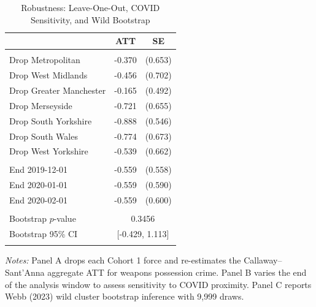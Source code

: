 \begin{table}[t]
\centering
\caption{Robustness: Leave-One-Out, COVID Sensitivity, and Wild Bootstrap}
\label{tab:robustness}
\begin{tabular}{lcc}
\hline\hline
 & ATT & SE \\
\hline
\addlinespace
\multicolumn{3}{l}{\textit{Panel A: Leave-one-out (drop one Cohort 1 force)}} \\
\addlinespace
\quad Drop Metropolitan & -0.370 & (0.653) \\
\quad Drop West Midlands & -0.456 & (0.702) \\
\quad Drop Greater Manchester & -0.165 & (0.492) \\
\quad Drop Merseyside & -0.721 & (0.655) \\
\quad Drop South Yorkshire & -0.888 & (0.546) \\
\quad Drop South Wales & -0.774 & (0.673) \\
\quad Drop West Yorkshire & -0.539 & (0.662) \\
\addlinespace
\multicolumn{3}{l}{\textit{Panel B: COVID sensitivity (vary end date)}} \\
\addlinespace
\quad End 2019-12-01 & -0.559 & (0.558) \\
\quad End 2020-01-01 & -0.559 & (0.590) \\
\quad End 2020-02-01 & -0.559 & (0.600) \\
\addlinespace
\multicolumn{3}{l}{\textit{Panel C: Wild cluster bootstrap}} \\
\addlinespace
\quad Bootstrap $p$-value & \multicolumn{2}{c}{0.3456} \\
\quad Bootstrap 95\% CI & \multicolumn{2}{c}{[-0.429, 1.113]} \\
\addlinespace
\hline\hline
\end{tabular}
\begin{tablenotes}
\item \textit{Notes:} Panel A drops each Cohort 1 force and re-estimates the Callaway--Sant'Anna aggregate ATT for weapons possession crime. Panel B varies the end of the analysis window to assess sensitivity to COVID proximity. Panel C reports Webb (2023) wild cluster bootstrap inference with 9,999 draws.
\end{tablenotes}
\end{table}
